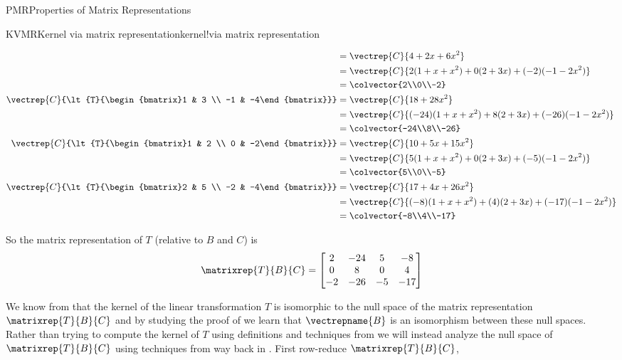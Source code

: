\begin{subsect}{PMR}{Properties of Matrix Representations}
\begin{example}{KVMR}{Kernel via matrix representation}{kernel!via matrix representation}
\begin{para}
\begin{align*}
&=\vectrep{C}{4+2x+6x^2}\\
&=\vectrep{C}{2(1+x+x^2)+0(2+3x)+(-2)(-1-2x^2)}\\
&=\colvector{2\\0\\-2}\\
%
\vectrep{C}{\lt{T}{\begin{bmatrix}1 & 3 \\ -1 & -4\end{bmatrix}}}
&=\vectrep{C}{18+28x^2}\\
&=\vectrep{C}{(-24)(1+x+x^2)+8(2+3x)+(-26)(-1-2x^2)}\\
&=\colvector{-24\\8\\-26}\\
%
\vectrep{C}{\lt{T}{\begin{bmatrix}1 & 2 \\ 0 & -2\end{bmatrix}}}
&=\vectrep{C}{10+5x+15x^2}\\
&=\vectrep{C}{5(1+x+x^2)+0(2+3x)+(-5)(-1-2x^2)}\\
&=\colvector{5\\0\\-5}\\
%
\vectrep{C}{\lt{T}{\begin{bmatrix}2 & 5 \\ -2 & -4\end{bmatrix}}}
&=\vectrep{C}{17+4x+26x^2}\\
&=\vectrep{C}{(-8)(1+x+x^2)+(4)(2+3x)+(-17)(-1-2x^2)}\\
&=\colvector{-8\\4\\-17}
%
\end{align*}
\end{para}
%
\begin{para}So the matrix representation of $T$ (relative to $B$ and $C$) is
%
\begin{equation*}
\matrixrep{T}{B}{C}
=
\begin{bmatrix}
 2 & -24 & 5 & -8 \\
 0 & 8 & 0 & 4 \\
 -2 & -26 & -5 & -17
\end{bmatrix}
\end{equation*}
\end{para}
%
\begin{para}We know from  that the kernel of the linear transformation $T$ is isomorphic to the null space of the matrix representation $\matrixrep{T}{B}{C}$ and by studying the proof of  we learn that $\vectrepname{B}$ is an isomorphism between these null spaces. Rather than trying to compute the kernel of $T$ using definitions and techniques from  we will instead analyze the null space of $\matrixrep{T}{B}{C}$ using techniques from way back in .  First row-reduce $\matrixrep{T}{B}{C}$,

\end{para}
\end{example}
\end{subsect}
